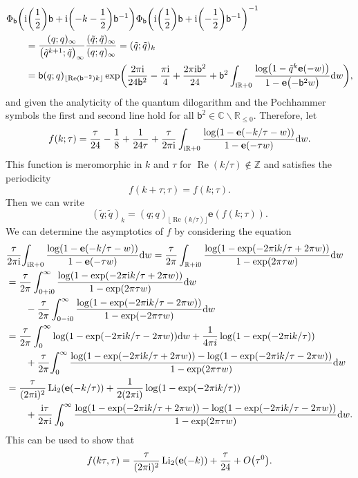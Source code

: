 \documentclass[pdftex]{sigma}
\numberwithin{equation}{section}
\def\BZ{\mathbb{Z}}
\def\BR{\mathbb{R}}
\def\BC{\mathbb{C}}
\def\tq{\tilde{q}}
\def\be{\begin{equation}}
\def\ee{\end{equation}}
\def\Li{\mathrm{Li}}
\def\e{\mathbf e}
\def\BZ{\mathbb Z}
\def\BR{\mathbb R}
\def\BC{\mathbb C}
\def\tq{\tilde{q}}
\def\Li{\operatorname{Li}}
\def\Re{\operatorname{Re}}
\def\be{\begin{equation}}
\def\ee{\end{equation}}
\begin{document}
\begin{align*}
 &\Phi_{\mathsf{b}}\biggl({\rm i}\biggl(\frac{1}{2}\biggr)\mathsf{b}+{\rm i} \biggl(-k-\frac{1}{2}\biggr)\mathsf{b}^{-1}\biggr)\Phi_{\mathsf{b}}\biggl({\rm i} \biggl(\frac{1}{2}\biggr)\mathsf{b}+{\rm i} \biggl(-\frac{1}{2}\biggr)\mathsf{b}^{-1}\biggr)^{-1}\\
 & \qquad =
 \frac{(q;q)_{\infty}}{\bigl(\tq^{k+1};\tq\bigr)_{\infty}}\frac{(\tq;\tq)_{\infty}}{(q;q)_{\infty}}
  =
 (\tq;\tq)_{k}\\
 & \qquad =
 \mathsf{b}(q;q)_{\lfloor\Re(\mathsf{b}^{-2})k\rfloor}
 \exp\biggl(\frac{2\pi {\rm i}}{24\mathsf{b}^{2}}-\frac{\pi {\rm i}}{4}+\frac{2\pi {\rm i}\mathsf{b}^{2}}{24}
 +\mathsf{b}^{2} \int_{{\rm i}\BR+0}\frac{\log\bigl(1-\tq^{k}\e(-w)\bigr)}{1-\e\bigl(-\mathsf{b}^{2}w\bigr)}{\rm d}w\biggr) ,
\end{align*}
and given the analyticity of the quantum dilogarithm and the Pochhammer symbols the first and second line hold for all $\mathsf{b}^{2}\in\BC\smallsetminus \BR_{\leq0}$. Therefore, let
\be\label{eq:f}
 f(k;\tau)
  =
 \frac{\tau}{24}-\frac{1}{8}+\frac{1}{24\tau}+\frac{\tau}{2\pi {\rm i}} \int_{{\rm i}\BR+0}\frac{\log(1-\e(-k/\tau-w))}{1-\e(-\tau w)}{\rm d}w .
\ee
This function is meromorphic in $k$ and $\tau$ for $\Re(k/\tau)\notin\BZ$ and satisfies the periodicity
\be\label{eq:f.per}
 f(k+\tau;\tau) =f(k;\tau) .
\ee
Then we can write
\be\label{eq:f.qp}
 (\tq;\tq)_{k}
  =
 (q;q)_{\lfloor\Re(k/\tau)\rfloor}
 \e(f(k;\tau)) .
\ee
We can determine the asymptotics of $f$ by considering the equation
\begin{align*}
 &\frac{\tau}{2\pi {\rm i}}\!\int_{{\rm i}\BR+0}\frac{\log(1-\e(-k/\tau-w))}{1-\e(-\tau w)}{\rm d}w
  =
 \frac{\tau}{2\pi} \int_{\BR+{\rm i}0}\frac{\log(1-\exp(-2\pi {\rm i}k/\tau+2\pi w))}{1-\exp(2\pi \tau w)}{\rm d}w\\
 &=
 \frac{\tau}{2\pi} \int_{0+{\rm i}0}^{\infty}\frac{\log(1-\exp(-2\pi {\rm i}k/\tau+2\pi w))}{1-\exp(2\pi \tau w)}{\rm d}w\\
 & \qquad
 -
 \frac{\tau}{2\pi} \int_{0-i0}^{\infty}\frac{\log(1-\exp(-2\pi {\rm i}k/\tau-2\pi w))}{1-\exp(-2\pi \tau w)}{\rm d}w\\
 &=
 \frac{\tau}{2\pi} \int_{0}^{\infty}\log(1-\exp(-2\pi {\rm i}k/\tau-2\pi w)){\rm d}w
 +\frac{1}{4\pi i}\log(1-\exp(-2\pi {\rm i}k/\tau))\\
 &\qquad+\frac{\tau}{2\pi}\!\int_{0}^{\infty}\frac{\log(1-\exp(-2\pi {\rm i}k/\tau+2\pi w))-\log(1-\exp(-2\pi {\rm i}k/\tau-2\pi w))}{1-\exp(2\pi \tau w)}{\rm d}w\\
 &=
 \frac{\tau}{(2\pi {\rm i})^2}\Li_{2}(\e(-k/\tau))
 +\frac{1}{2(2\pi {\rm i})}\log(1-\exp(-2\pi {\rm i}k/\tau))\\
 &\qquad+\frac{{\rm i}\tau}{2\pi {\rm i}} \int_{0}^{\infty}\frac{\log(1-\exp(-2\pi {\rm i}k/\tau+2\pi w))-\log(1-\exp(-2\pi {\rm i}k/\tau-2\pi w))}{1-\exp(2\pi \tau w)}{\rm d}w .
\end{align*}
This can be used to show that
\be\label{eq:asymp.f}
 f(k\tau,\tau) =\frac{\tau}{(2\pi {\rm i})^2}\Li_2(\e(-k))+\frac{\tau}{24}+O\bigl(\tau^0\bigr) .
\ee
\end{document}
